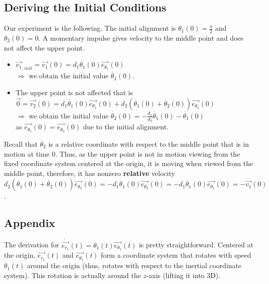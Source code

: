 \documentclass[12pt]{article}
\renewcommand{\vec}[1]{\ensuremath{\overrightarrow{#1}}}
\begin{document}
\subsection*{Deriving the Initial Conditions}
Our experiment is the following. The initial alignment is $\theta_1(0) = \frac{\pi}{2}$ and $\theta_2(0) = 0$. A momentary impulse gives velocity to the middle point and does not affect the upper point.
\begin{itemize}
 \item $\vec{v_1}_{, init} = \vec{v_1}(0) = d_1 \dot{\theta_1}(0) \vec{e_{\theta_1}}(0)$ \\
 \hspace*{0.5cm} $\Rightarrow$ we obtain the initial value $\dot{\theta_1}(0)$.
 
 \item The upper point is not affected that is $\vec{0} = \vec{v_2}(0) = d_1 \dot{\theta_1}(0) \vec{e_{\theta_1}}(0) + d_2 (\dot{\theta_1}(0) + \dot{\theta_2}(0)) \vec{e_{\theta_2}}(0)$\\
 \hspace*{0.5cm} $\Rightarrow$ we obtain the initial value $\dot{\theta_2}(0) = - \frac{d_1}{d_2} \dot{\theta_1}(0) - \dot{\theta_1}(0)$\\
 \hspace*{1.1cm} as $\vec{e_{\theta_1}}(0) = \vec{e_{\theta_2}}(0)$ due to the initial alignment.
\end{itemize}

Recall that $\dot\theta_2$ is a relative coordinate with respect to the middle point that is in motion at time $0$. 
Thus, as the upper point is not in motion viewing from the fixed coordinate system centered at the origin, it is moving 
when viewed from the middle point, therefore, it has nonzero {\bf relative} velocity $d_2 (\dot{\theta_1}(0) + \dot{\theta_2}(0)) \vec{e_{\theta_2}}(0) = - d_1 \dot{\theta_1}(0) \vec{e_{\theta_2}}(0) = - d_1 \dot{\theta_1}(0) \vec{e_{\theta_1}}(0) = - \vec{v_1}(0)$.

\newpage
\subsection*{Appendix}
The derivation for $\dot{\vec{e_{r_1}}}(t) = \dot{\theta_1}(t) \vec{e_{\theta_1}}(t)$ is pretty straightforward. Centered at the origin, 
$\vec{e_{r_1}}(t)$ and $\vec{e_{\theta_1}}(t)$ form a coordinate system that rotates with speed $\dot{\theta_1}(t)$ around the origin 
(thus, rotates with respect to the inertial coordinate system). This rotation is actually around the $z$-axis (lifting it into 3D).
\end{document}

